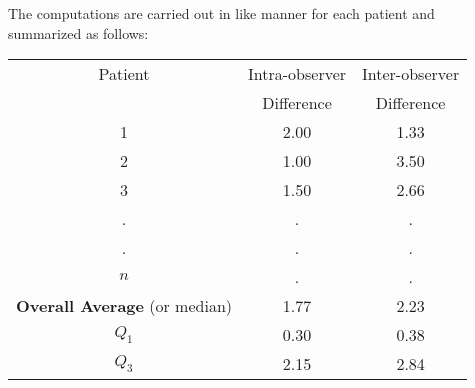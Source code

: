 The computations are carried out in like manner for each patient and
summarized as follows:

\begin{center}\begin{tabular}{ccc}
Patient & Intra-observer & Inter-observer\\
        & Difference     & Difference\\ \hline
1 & 2.00 & 1.33\\
2 & 1.00 & 3.50\\
3 & 1.50 & 2.66\\
. & .    & .\\
. & .    & .\\
$n$ & . & . \\ \hline
\textbf{Overall Average} (or median) & 1.77 & 2.23\\
$Q_{1}$ & 0.30 & 0.38\\
$Q_{3}$ & 2.15 & 2.84\\
\end{tabular}\end{center}

